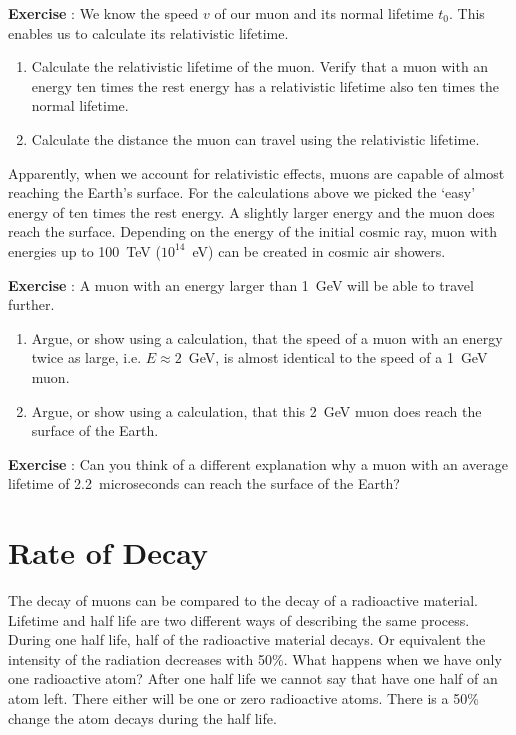 \documentclass[12pt,a4paper]{article}
\numberwithin{equation}{section}
\numberwithin{figure}{section}
\newcounter{Exercise}
\numberwithin{table}{section}
\begin{document}
\begin{shaded}
\textbf{Exercise \theExercise {}} : We know the speed $v$ of our muon and its normal lifetime $t_0$. This enables us to calculate its relativistic lifetime.
\begin{enumerate}[-]
\item Calculate the relativistic lifetime of the muon. Verify that a muon with an energy ten times the rest energy has a relativistic lifetime also ten times the normal lifetime.
\item Calculate the distance the muon can travel using the relativistic lifetime.
\end{enumerate}\end{shaded}

Apparently, when we account for relativistic effects, muons are capable of almost reaching the Earth's surface. For the calculations above we picked the `easy' energy of ten times the rest energy. A slightly larger energy and the muon does reach the surface. Depending on the energy of the initial cosmic ray, muon with energies up to 100~TeV ($10^{14}$~eV) can be created in cosmic air showers.

\begin{shaded}
\textbf{Exercise \theExercise {}} : A muon with an energy larger than 1~GeV will be able to travel further.
\begin{enumerate}[-]
\item Argue, or show using a calculation, that the speed of a muon with an energy twice as large, i.e. $E \approx 2$~GeV, is almost identical to the speed of a 1~GeV muon.
\item Argue, or show using a calculation, that this 2~GeV muon does reach the surface of the Earth.
\end{enumerate}\end{shaded}

\begin{shaded}
\textbf{Exercise \theExercise {}} : Can you think of a different explanation why a muon with an average lifetime of 2.2~microseconds can reach the surface of the Earth?\end{shaded}

\section{Rate of Decay}
The decay of muons can be compared to the decay of a radioactive material. Lifetime and half life are two different ways of describing the same process. During one half life, half of the radioactive material decays. Or equivalent the intensity of the radiation decreases with 50\%. What happens when we have only one radioactive atom? After one half life we cannot say that have one half of an atom left. There either will be one or zero radioactive atoms. There is a 50\% change the atom decays during the half life.
\end{document}
